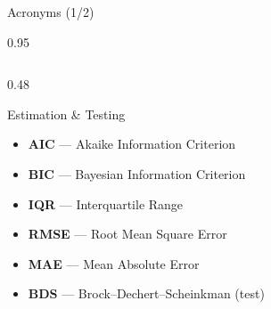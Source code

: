 \documentclass[9pt, aspectratio=169, t]{beamer}
\begin{document}
\begin{frame}{Acronyms (1/2)}
\begin{cminipage}{0.95\textwidth}
{\begin{columns}[T]
\begin{column}{0.48\textwidth}
\begin{exampleblock}{Estimation \& Testing}
\begin{itemize}
                    \item \textbf{AIC} --- Akaike Information Criterion
                    \item \textbf{BIC} --- Bayesian Information Criterion
                    \item \textbf{IQR} --- Interquartile Range
                    \item \textbf{RMSE} --- Root Mean Square Error
                    \item \textbf{MAE} --- Mean Absolute Error
                    \item \textbf{BDS} --- Brock--Dechert--Scheinkman (test)
                \end{itemize}
            \end{exampleblock}
        \end{column}
    \end{columns}
    }
    \end{cminipage}
\end{frame}
\end{document}
